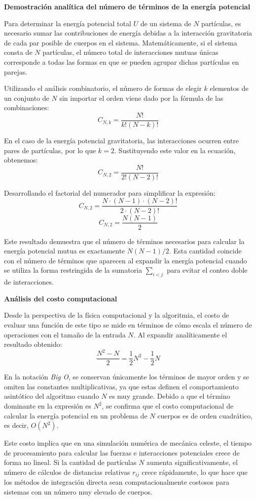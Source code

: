 \documentclass[a4paper]{article}
\begin{document}
\textbf{Demostración analítica del número de términos de la energía potencial}

Para determinar la energía potencial total $U$ de un sistema de $N$ partículas, es necesario sumar las contribuciones de energía debidas a la interacción gravitatoria de cada par posible de cuerpos en el sistema. Matemáticamente, si el sistema consta de $N$ partículas, el número total de interacciones mutuas únicas corresponde a todas las formas en que se pueden agrupar dichas partículas en parejas.

Utilizando el análisis combinatorio, el número de formas de elegir $k$ elementos de un conjunto de $N$ sin importar el orden viene dado por la fórmula de las combinaciones:
$$ C_{N,k} = \frac{N!}{k!(N-k)!} $$

En el caso de la energía potencial gravitatoria, las interacciones ocurren entre pares de partículas, por lo que $k=2$. Sustituyendo este valor en la ecuación, obtenemos:
$$ C_{N,2} = \frac{N!}{2!(N-2)!} $$

Desarrollando el factorial del numerador para simplificar la expresión:
$$ C_{N,2} = \frac{N \cdot (N-1) \cdot (N-2)!}{2 \cdot (N-2)!} $$
$$ C_{N,2} = \frac{N(N-1)}{2} $$

Este resultado demuestra que el número de términos necesarios para calcular la energía potencial mutua es exactamente $N(N-1)/2$. Esta cantidad coincide con el número de términos que aparecen al expandir la energía potencial cuando se utiliza la forma restringida de la sumatoria $\sum_{i<j}$ para evitar el conteo doble de interacciones.

\textbf{Análisis del costo computacional}

Desde la perspectiva de la física computacional y la algoritmia, el costo de evaluar una función de este tipo se mide en términos de cómo escala el número de operaciones con el tamaño de la entrada $N$. Al expandir analíticamente el resultado obtenido:
$$ \frac{N^2 - N}{2} = \frac{1}{2}N^2 - \frac{1}{2}N $$

En la notación \textit{Big O}, se conservan únicamente los términos de mayor orden y se omiten las constantes multiplicativas, ya que estas definen el comportamiento asintótico del algoritmo cuando $N$ es muy grande. Debido a que el término dominante en la expresión es $N^2$, se confirma que el costo computacional de calcular la energía potencial en un problema de $N$ cuerpos es de orden cuadrático, es decir, $O(N^2)$.

Este costo implica que en una simulación numérica de mecánica celeste, el tiempo de procesamiento para calcular las fuerzas e interacciones potenciales crece de forma no lineal. Si la cantidad de partículas $N$ aumenta significativamente, el número de cálculos de distancias relativas $r_{ij}$ crece rápidamente, lo que hace que los métodos de integración directa sean computacionalmente costosos para sistemas con un número muy elevado de cuerpos.
\end{document}
